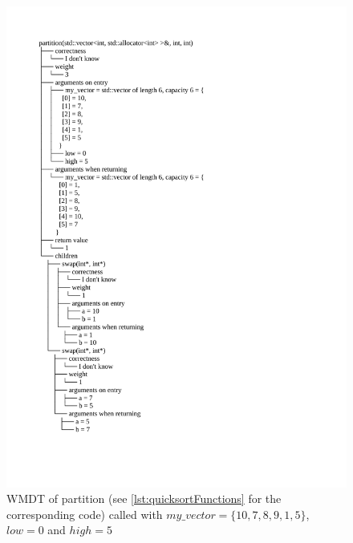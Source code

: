 \begin{figure}[p]
\centering
    \caption{WMDT of partition (see \ref{lst:quicksortFunctions} for the corresponding code) called with \(my\_vector = \{10, 7, 8, 9, 1, 5\}\), \(low = 0\) and \(high = 5\)}
    \label{fig:partitionTree}
\includegraphics[width=\textwidth,height=\textheight,keepaspectratio]{Imagenes/Vectorial/partitionTree.pdf}
\end{figure}

